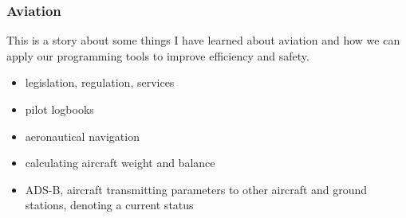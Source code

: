 \begin{frame}
\frametitle{Aviation}
\begin{block}{This is a story about some things I have learned about aviation and how we can
apply our programming tools to improve efficiency and safety.}
\begin{itemize}
\item \tiny{legislation, regulation, services}
\item \tiny{pilot logbooks}
\item \tiny{aeronautical navigation}
\item \tiny{calculating aircraft weight and balance}
\item \tiny{ADS-B, aircraft transmitting parameters to other aircraft and ground stations, denoting a current status}
\end{itemize}
\end{block}
\end{frame}
